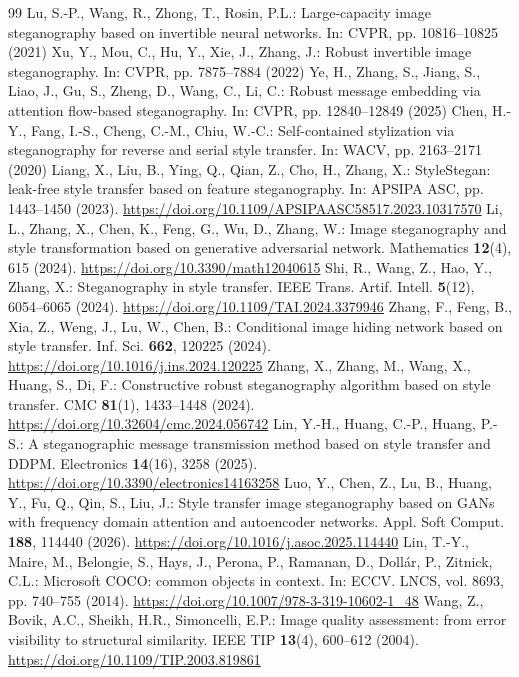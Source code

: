 \documentclass[runningheads]{llncs}
\providecommand{\doi}[1]{\href{https://doi.org/#1}{https://doi.org/#1}}
\begin{document}
\begin{thebibliography}{99}
 Lu, S.-P., Wang, R., Zhong, T., Rosin, P.L.: Large-capacity image steganography based on invertible neural networks. In: CVPR, pp. 10816--10825 (2021)
 Xu, Y., Mou, C., Hu, Y., Xie, J., Zhang, J.: Robust invertible image steganography. In: CVPR, pp. 7875--7884 (2022)
 Ye, H., Zhang, S., Jiang, S., Liao, J., Gu, S., Zheng, D., Wang, C., Li, C.: Robust message embedding via attention flow-based steganography. In: CVPR, pp. 12840--12849 (2025)
 Chen, H.-Y., Fang, I.-S., Cheng, C.-M., Chiu, W.-C.: Self-contained stylization via steganography for reverse and serial style transfer. In: WACV, pp. 2163--2171 (2020)
 Liang, X., Liu, B., Ying, Q., Qian, Z., Cho, H., Zhang, X.: StyleStegan: leak-free style transfer based on feature steganography. In: APSIPA ASC, pp. 1443--1450 (2023). \doi{10.1109/APSIPAASC58517.2023.10317570}
 Li, L., Zhang, X., Chen, K., Feng, G., Wu, D., Zhang, W.: Image steganography and style transformation based on generative adversarial network. Mathematics \textbf{12}(4), 615 (2024). \doi{10.3390/math12040615}
 Shi, R., Wang, Z., Hao, Y., Zhang, X.: Steganography in style transfer. IEEE Trans. Artif. Intell. \textbf{5}(12), 6054--6065 (2024). \doi{10.1109/TAI.2024.3379946}
 Zhang, F., Feng, B., Xia, Z., Weng, J., Lu, W., Chen, B.: Conditional image hiding network based on style transfer. Inf. Sci. \textbf{662}, 120225 (2024). \doi{10.1016/j.ins.2024.120225}
 Zhang, X., Zhang, M., Wang, X., Huang, S., Di, F.: Constructive robust steganography algorithm based on style transfer. CMC \textbf{81}(1), 1433--1448 (2024). \doi{10.32604/cmc.2024.056742}
 Lin, Y.-H., Huang, C.-P., Huang, P.-S.: A steganographic message transmission method based on style transfer and DDPM. Electronics \textbf{14}(16), 3258 (2025). \doi{10.3390/electronics14163258}
 Luo, Y., Chen, Z., Lu, B., Huang, Y., Fu, Q., Qin, S., Liu, J.: Style transfer image steganography based on GANs with frequency domain attention and autoencoder networks. Appl. Soft Comput. \textbf{188}, 114440 (2026). \doi{10.1016/j.asoc.2025.114440}
 Lin, T.-Y., Maire, M., Belongie, S., Hays, J., Perona, P., Ramanan, D., Doll\'ar, P., Zitnick, C.L.: Microsoft COCO: common objects in context. In: ECCV. LNCS, vol. 8693, pp. 740--755 (2014). \doi{10.1007/978-3-319-10602-1_48}
 Wang, Z., Bovik, A.C., Sheikh, H.R., Simoncelli, E.P.: Image quality assessment: from error visibility to structural similarity. IEEE TIP \textbf{13}(4), 600--612 (2004). \doi{10.1109/TIP.2003.819861}

\end{thebibliography}
\end{document}
